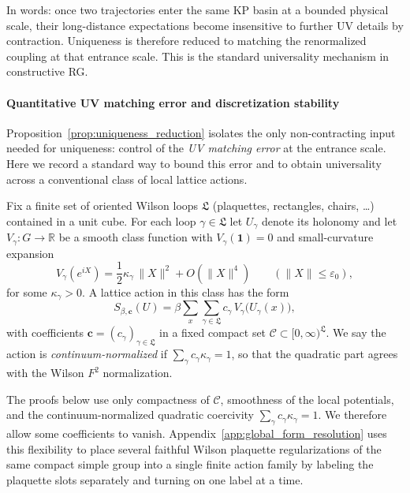 \begin{remark}
In words: once two trajectories enter the same KP basin at a bounded physical scale, their long-distance expectations become
insensitive to further UV details by contraction. Uniqueness is therefore reduced to matching the renormalized coupling at that entrance scale.
This is the standard universality mechanism in constructive RG.
\end{remark}


\paragraph*{Quantitative UV matching error and discretization stability}

Proposition~\ref{prop:uniqueness_reduction} isolates the only non-contracting input needed for uniqueness: control of the
\emph{UV matching error} at the entrance scale.
Here we record a standard way to bound this error and to obtain universality across a conventional class of local lattice actions.

\begin{definition}\label{def:action_universality_class}
Fix a finite set of oriented Wilson loops $\mathfrak L$ (plaquettes, rectangles, chairs, \dots) contained in a unit cube.
For each loop $\gamma\in\mathfrak L$ let $U_\gamma$ denote its holonomy and let $V_\gamma:G\to\mathbb R$ be a smooth class function
with $V_\gamma(\mathbf 1)=0$ and small-curvature expansion
\begin{equation}\label{eq:loop_potential_expansion}
 V_\gamma(e^{iX})=\frac{1}{2}\kappa_\gamma\,\|X\|^2 + O(\|X\|^4)\qquad (\|X\|\le \varepsilon_0),
\end{equation}
for some $\kappa_\gamma>0$.
A lattice action in this class has the form
\begin{equation}\label{eq:general_local_action}
 S_{\beta,\mathbf c}(U)=\beta\sum_{x}\sum_{\gamma\in\mathfrak L} c_\gamma\,V_\gamma\!\bigl(U_\gamma(x)\bigr),
\end{equation}
with coefficients $\mathbf c=(c_\gamma)_{\gamma\in\mathfrak L}$ in a fixed compact set $\mathcal C\subset[0,\infty)^{\mathfrak L}$.
We say the action is \emph{continuum-normalized} if $\sum_{\gamma} c_\gamma\kappa_\gamma=1$, so that the quadratic part agrees with the Wilson
$F^2$ normalization.
\end{definition}

\begin{remark}
\label{rem:action_class_sparse}
The proofs below use only compactness of $\mathcal C$, smoothness of the local potentials, and the continuum-normalized quadratic coercivity
$\sum_{\gamma}c_\gamma\kappa_\gamma=1$.
We therefore allow some coefficients to vanish.
Appendix~\ref{app:global_form_resolution} uses this flexibility to place several faithful Wilson plaquette regularizations of the same compact simple group into a single finite action family by labeling the plaquette slots separately and turning on one label at a time.
\end{remark}

